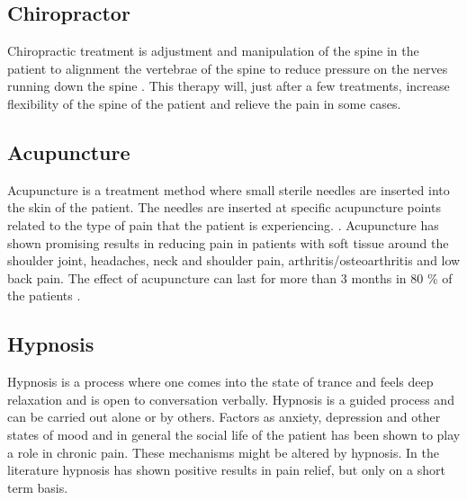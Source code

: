 \subsection{Chiropractor}
Chiropractic treatment is adjustment and manipulation of the spine in the patient to alignment the vertebrae of the spine to reduce pressure on the nerves running down the spine \cite{Gerald2013}. This therapy will, just after a few treatments, increase flexibility of the spine of the patient and relieve the pain in some cases.  \cite{Peterson2012}

\subsection{Acupuncture}
Acupuncture is a treatment method where small sterile needles are inserted into the skin of the patient. The needles are inserted at specific acupuncture points related to the type of pain that the patient is experiencing. \cite{Dhanani2011}. Acupuncture has shown promising results in reducing pain in patients with soft tissue around the shoulder joint, headaches, neck and shoulder pain, arthritis/osteoarthritis and low back pain. The effect of acupuncture can last for more than 3 months in 80 \% of the patients \cite{Junnilla1983}. 

\subsection{Hypnosis}
Hypnosis is a process where one comes into the state of trance and feels deep relaxation and is open to conversation verbally. Hypnosis is a guided process and can be carried out alone or by others. \cite{Gerald2013} Factors as anxiety, depression and other states of mood and in general the social life of the patient has been shown to play a role in chronic pain. These mechanisms might be altered by hypnosis.
In the literature hypnosis has shown positive results in pain relief, but only on a short term basis. \cite{Dhanani2011}

